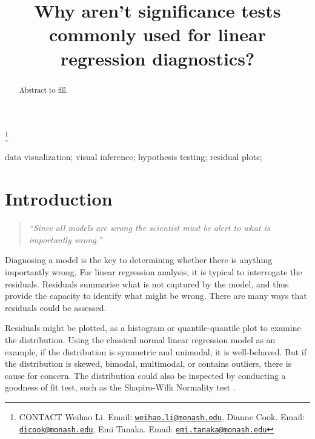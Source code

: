 \documentclass[]{interact}
\theoremstyle{plain}%
\theoremstyle{definition}
\theoremstyle{remark}
\begin{document}

\title{Why aren't significance tests commonly used for linear regression
diagnostics?}


\author{
}

\thanks{CONTACT Weihao
Li. Email: \href{mailto:weihao.li@monash.edu}{\nolinkurl{weihao.li@monash.edu}}, Dianne
Cook. Email: \href{mailto:dicook@monash.edu}{\nolinkurl{dicook@monash.edu}}, Emi
Tanaka. Email: \href{mailto:emi.tanaka@monash.edu}{\nolinkurl{emi.tanaka@monash.edu}}}

\maketitle

\begin{abstract}
Abstract to fill.
\end{abstract}

\begin{keywords}
data visualization; visual inference; hypothesis testing; residual
plots;
\end{keywords}

\hypertarget{introduction}{%
\section{Introduction}\label{introduction}}

\begin{quote}
\emph{``Since all models are wrong the scientist must be alert to what
is importantly wrong.''} \citep{box1976science}
\end{quote}

Diagnosing a model is the key to determining whether there is anything
importantly wrong. For linear regression analysis, it is typical to
interrogate the residuals. Residuals summarise what is not captured by
the model, and thus provide the capacity to identify what might be
wrong. There are many ways that residuals could be assessed.

Residuals might be plotted, as a histogram or quantile-quantile plot to
examine the distribution. Using the classical normal linear regression
model as an example, if the distribution is symmetric and unimodal, it
is well-behaved. But if the distribution is skewed, bimodal, multimodal,
or contains outliers, there is cause for concern. The distribution could
also be inspected by conducting a goodness of fit test, such as the
Shapiro-Wilk Normality test \citep{shapiro1965analysis}.
\end{document}

